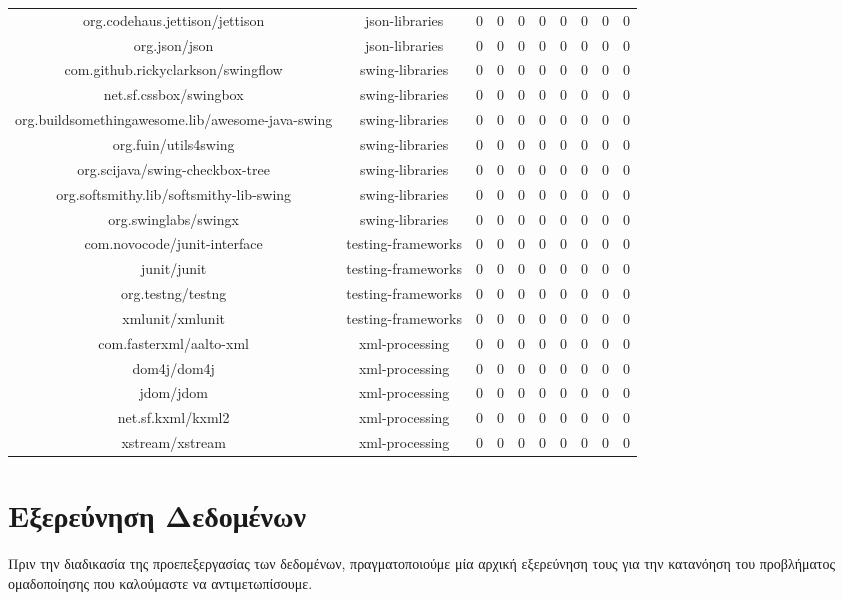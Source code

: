 \begin{center}
{\begin{tabular}{|c|c|c|c|c|c|c|c|c|c|}
org.codehaus.jettison/jettison & json-libraries & 0 & 0 & 0 & 0 & 0 & 0 & 0 & 0 \\
org.json/json & json-libraries & 0 & 0 & 0 & 0 & 0 & 0 & 0 & 0 \\
com.github.rickyclarkson/swingflow & swing-libraries & 0 & 0 & 0 & 0 & 0 & 0 & 0 & 0 \\
net.sf.cssbox/swingbox & swing-libraries & 0 & 0 & 0 & 0 & 0 & 0 & 0 & 0 \\
org.buildsomethingawesome.lib/awesome-java-swing & swing-libraries & 0 & 0 & 0 & 0 & 0 & 0 & 0 & 0 \\
org.fuin/utils4swing & swing-libraries & 0 & 0 & 0 & 0 & 0 & 0 & 0 & 0 \\
org.scijava/swing-checkbox-tree & swing-libraries & 0 & 0 & 0 & 0 & 0 & 0 & 0 & 0 \\
org.softsmithy.lib/softsmithy-lib-swing & swing-libraries & 0 & 0 & 0 & 0 & 0 & 0 & 0 & 0 \\
org.swinglabs/swingx & swing-libraries & 0 & 0 & 0 & 0 & 0 & 0 & 0 & 0 \\
com.novocode/junit-interface & testing-frameworks & 0 & 0 & 0 & 0 & 0 & 0 & 0 & 0 \\
junit/junit & testing-frameworks & 0 & 0 & 0 & 0 & 0 & 0 & 0 & 0 \\
org.testng/testng & testing-frameworks & 0 & 0 & 0 & 0 & 0 & 0 & 0 & 0 \\
xmlunit/xmlunit & testing-frameworks & 0 & 0 & 0 & 0 & 0 & 0 & 0 & 0 \\
com.fasterxml/aalto-xml & xml-processing & 0 & 0 & 0 & 0 & 0 & 0 & 0 & 0 \\
dom4j/dom4j & xml-processing & 0 & 0 & 0 & 0 & 0 & 0 & 0 & 0 \\
jdom/jdom & xml-processing & 0 & 0 & 0 & 0 & 0 & 0 & 0 & 0 \\
net.sf.kxml/kxml2 & xml-processing & 0 & 0 & 0 & 0 & 0 & 0 & 0 & 0 \\
xstream/xstream & xml-processing & 0 & 0 & 0 & 0 & 0 & 0 & 0 & 0 \\ \hline
\end{tabular}
}
\label{table:init}
\end{center}

\section{Εξερεύνηση Δεδομένων}
Πριν την διαδικασία της προεπεξεργασίας των δεδομένων, πραγματοποιούμε μία αρχική εξερεύνηση τους για την κατανόηση του προβλήματος ομαδοποίησης που καλούμαστε να αντιμετωπίσουμε.

